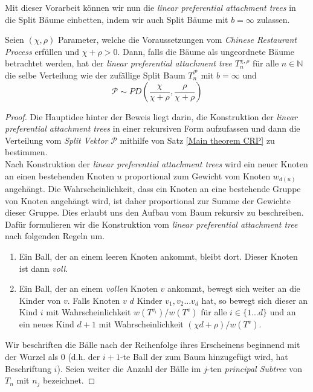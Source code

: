 Mit dieser Vorarbeit können wir nun die \textit{linear preferential attachment trees} in die Split Bäume einbetten, indem wir auch Split Bäume mit $b = \infty$ zulassen.
\begin{theorem}
    \label{main theorem paper}
    Seien $(\chi,\rho)$ Parameter, welche die Voraussetzungen vom \textit{Chinese Restaurant Process} erfüllen und $\chi + \rho > 0$. Dann, falls die Bäume als ungeordnete Bäume betrachtet werden, hat der \textit{linear preferential attachment tree} $T_n^{\chi,\rho}$ für alle $n \in \mathbb{N}$ die selbe Verteilung wie der zufällige Split Baum $T^\mathcal{P}_n$ mit $b = \infty$ und 
    \[ 
    \mathcal{P} \sim PD(\frac{\chi}{\chi + \rho}, \frac{\rho}{\chi + \rho})
    \] 
\end{theorem}
\begin{proof}
    Die Hauptidee hinter der Beweis liegt darin, die Konstruktion der \textit{linear preferential attachment trees} in einer rekursiven Form aufzufassen und dann die Verteilung vom \textit{Split Vektor} $\mathcal{P}$ mithilfe von Satz \ref{Main theorem CRP} zu bestimmen.\\
    Nach Konstruktion der \textit{linear preferential attachment trees} wird ein neuer Knoten an einen bestehenden Knoten $u$ proportional zum Gewicht vom Knoten $w_{d(u)}$ angehängt. Die Wahrscheinlichkeit, dass ein Knoten an eine bestehende Gruppe von Knoten angehängt wird, ist daher proportional zur Summe der Gewichte dieser Gruppe. Dies erlaubt uns den Aufbau vom Baum rekursiv zu beschreiben. Dafür formulieren wir die Konstruktion vom \textit{linear preferential attachment tree} nach folgenden Regeln um.
    \begin{enumerate}
        \item Ein Ball, der an einem leeren Knoten ankommt, bleibt dort. Dieser Knoten ist dann \textit{voll}.
        \item Ein Ball, der an einem \textit{vollen} Knoten $v$ ankommt, bewegt sich weiter an die Kinder von $v$. Falls Knoten $v$ $d$ Kinder $v_1,v_2...v_d$ hat, so bewegt sich dieser an Kind $i$ mit Wahrscheinlichkeit $w(T^{v_i})/w(T^{v})$ für alle $i \in \{1...d\}$ und an ein neues Kind $d+1$ mit Wahrscheinlichkeit $(\chi d + \rho)/w(T^{v})$.
    \end{enumerate} 
    Wir beschriften die Bälle nach der Reihenfolge ihres Erscheinens beginnend mit der Wurzel als $0$ (d.h. der $i+1$-te Ball der zum Baum hinzugefügt wird, hat Beschriftung $i$). Seien weiter die Anzahl der Bälle im $j$-ten \textit{principal Subtree} von $T_n$ mit $n_j$ bezeichnet.

\end{proof}
